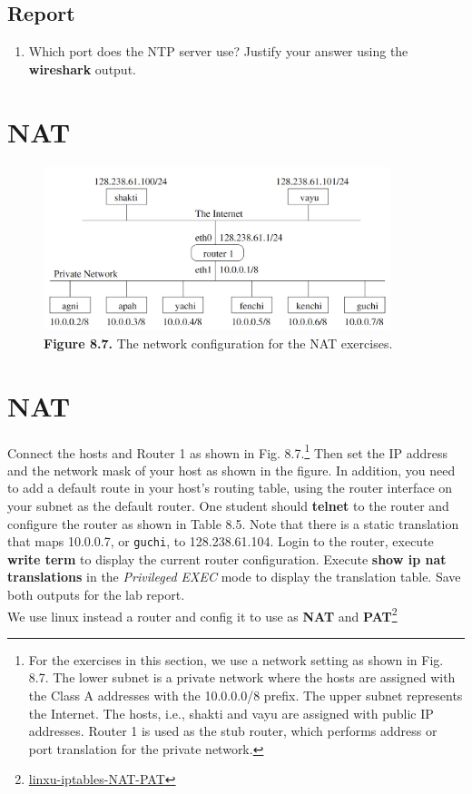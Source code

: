 \documentclass[10pt,a4paper]{article}
\numberwithin{equation}{section}
\numberwithin{figure}{section}
\numberwithin{table}{section}
\begin{document}
    \subsection*{Report}
    \begin{enumerate}
        \item Which port does the NTP server use?
        Justify your answer using the \textbf{wireshark} output.
    \end{enumerate}

    \section*{NAT}
    
    \begin{figure}[H]
        \centering
        \includegraphics[width=0.9\textwidth]{img/fig1.png}
        \caption{\textbf{Figure 8.7.} The network configuration for the NAT exercises.}
        \label{fig:8.7}
    \end{figure}
    \section{NAT}
    Connect the hosts and Router 1 as shown in Fig.
    8.7.\footnote{For the exercises in this section, we use a network setting as shown in Fig. 8.7. The lower subnet is a private network where the hosts are assigned with the Class A addresses with the 10.0.0.0/8 prefix. The upper subnet represents the Internet. The hosts, i.e., shakti and vayu are assigned with public IP addresses. Router 1 is used as the stub router, which performs address or port translation for the private network.} Then set the IP address and the network mask of your host as shown in the figure.
    In addition, you need to add a default route in your host’s routing table, using the router interface on your subnet as the default router.
    One student should \textbf{telnet} to the router and configure the router as shown in Table 8.5. Note that there is a static translation that maps 10.0.0.7, or \texttt{guchi}, to 128.238.61.104.
    Login to the router, execute \textbf{write term} to display the current router configuration.
    Execute \textbf{show ip nat translations} in the \textit{Privileged EXEC} mode to display the translation table.
    Save both outputs for the lab report.\\
    We use linux instead a router and config it to use as \textbf{NAT} and \textbf{PAT}\footnote{\href{http://www.solutionsatexperts.com/iptables-nat-pat/}{linxu-iptables-NAT-PAT}}
\end{document}
